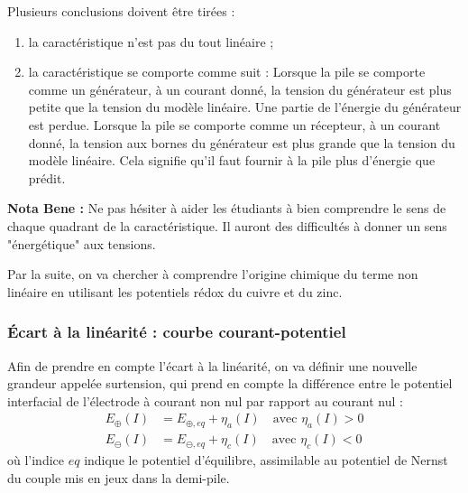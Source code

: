 \documentclass[twoside,a4paper,11pt,answers,addpoints]{exam}
\newcounter{foo} %
\begin{document}
\begin{questions}
\begin{framed}
\begin{solution}
Plusieurs conclusions doivent être tirées : 
\begin{enumerate}
\item la caractéristique n'est pas du tout linéaire ;
\item la caractéristique se comporte comme suit : 
Lorsque la pile se comporte comme un générateur, à un courant donné, la tension du générateur est plus petite que la tension du modèle linéaire. Une partie de l'énergie du générateur est perdue. Lorsque la pile se comporte comme un récepteur, à un courant donné, la tension aux bornes du générateur est plus grande que la tension du modèle linéaire. Cela signifie qu'il faut fournir à la pile plus d'énergie que prédit.
\end{enumerate}
\textbf{Nota Bene :} Ne pas hésiter à aider les étudiants à bien comprendre le sens de chaque quadrant de la caractéristique. Il auront des difficultés à donner un sens "énergétique" aux tensions.
\end{solution}
\end{framed}
\setcounter{foo}{\value{question}}
\end{questions}

Par la suite, on va chercher à comprendre l'origine chimique du terme non linéaire en utilisant les potentiels rédox du cuivre et du zinc.

\subsubsection{\'{E}cart à la linéarité : courbe courant-potentiel}

Afin de prendre en compte l'écart à la linéarité, on va définir une nouvelle grandeur appelée surtension, qui prend en compte la différence entre le potentiel interfacial de l'électrode à courant non nul par rapport au courant nul : 
\begin{align*}
E_\oplus (I) &= E_{\oplus, eq} + \eta_a (I) \quad \text{avec }\eta_a (I) > 0 \\
E_\ominus (I) &= E_{\ominus, eq} + \eta_c (I) \quad \text{avec }\eta_c (I) < 0
\end{align*}
où l'indice $eq$ indique le potentiel d'équilibre, assimilable au potentiel de Nernst du couple mis en jeux dans la demi-pile.
\end{document}
